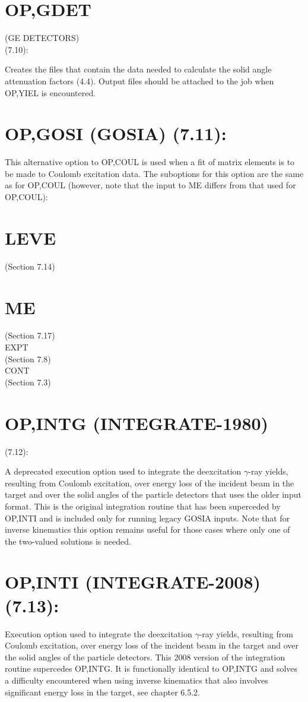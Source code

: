 \documentclass[10pt]{article}
\begin{document}
\section*{OP,GDET}
(GE DETECTORS)\\
(7.10):

Creates the files that contain the data needed to calculate the solid angle attenuation factors (4.4). Output files should be attached to the job when OP,YIEL is encountered.

\section*{OP,GOSI (GOSIA) (7.11):}
This alternative option to OP,COUL is used when a fit of matrix elements is to be made to Coulomb excitation data. The suboptions for this option are the same as for OP,COUL (however, note that the input to ME differs from that used for OP,COUL):

\section*{LEVE}
(Section 7.14)

\section*{ME}
(Section 7.17)\\
EXPT\\
(Section 7.8)\\
CONT\\
(Section 7.3)

\section*{OP,INTG (INTEGRATE-1980)}
(7.12):

A deprecated execution option used to integrate the deexcitation $\gamma$-ray yields, resulting from Coulomb excitation, over energy loss of the incident beam in the target and over the solid angles of the particle detectors that uses the older input format. This is the original integration routine that has been superceded by OP,INTI and is included only for running legacy GOSIA inputs. Note that for inverse kinematics this option remains useful for those cases where only one of the two-valued solutions is needed.

\section*{OP,INTI (INTEGRATE-2008) (7.13):}
Execution option used to integrate the deexcitation $\gamma$-ray yields, resulting from Coulomb excitation, over energy loss of the incident beam in the target and over the solid angles of the particle detectors. This 2008 version of the integration routine supercedes OP,INTG. It is functionally identical to OP,INTG and solves a difficulty encountered when using inverse kinematics that also involves significant energy loss in the target, see chapter 6.5.2.
\end{document}
